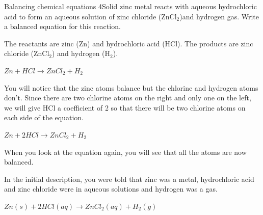 \begin{wex}{Balancing chemical equations 4}{Solid zinc metal reacts with aqueous hydrochloric acid to form an aqueous solution of zinc chloride (ZnCl$_{2}$)and hydrogen gas. Write a balanced equation for this reaction.\\}

{
The reactants are zinc (Zn) and hydrochloric acid (HCl). The products are zinc chloride (ZnCl$_{2}$) and hydrogen (H$_{2}$).\\
}

{
\begin{center}
\rm${Zn + HCl \rightarrow ZnCl_{2} + H_{2}}$\\
\end{center}
}

{
You will notice that the zinc atoms balance but the chlorine and hydrogen atoms don't. Since there are two chlorine atoms on the right and only one on the left, we will give HCl a coefficient of 2 so that there will be two chlorine atoms on each side of the equation.

\begin{center}
\rm${Zn + 2HCl \rightarrow ZnCl_{2} + H_{2}}$\\
\end{center}
}

{
When you look at the equation again, you will see that all the atoms are now balanced.\\
}

{
In the initial description, you were told that zinc was a metal, hydrochloric acid and zinc chloride were in aqueous solutions and hydrogen was a gas.

\begin{center}
\rm${Zn(s) + 2HCl(aq) \rightarrow ZnCl_{2}(aq) + H_{2}(g)}$
\end{center}
}
\end{wex}
    \noindent
\par
            \label{m38727*secfhsst!!!underscore!!!id1086}\vspace{.5cm} 
